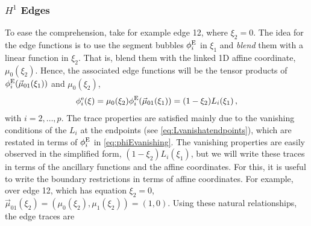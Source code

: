 
%

\subsubsection{\texorpdfstring{$H^1$}{H1} Edges}
\label{sec:H1edgesQuad}
To ease the comprehension, take for example edge 12, where $\xi_2=0$.
The idea for the edge functions is to use the segment bubbles $\phi_i^{\mathrm{E}}$ in $\xi_1$ and \textit{blend} them with a linear function in $\xi_2$.
That is, blend them with the linked 1D affine coordinate, $\mu_0(\xi_2)$.
Hence, the associated edge functions will be the tensor products of $\phi_i^{\mathrm{E}}(\vec{\mu}_{01}(\xi_1))$ and $\mu_0(\xi_2)$,
\begin{equation*}
    \phi_i^\mathrm{e}(\xi)=\mu_0(\xi_2)\phi_i^{\mathrm{E}}(\vec{\mu}_{01}(\xi_1))=(1-\xi_2)L_i(\xi_1)\,,
\end{equation*}
with $i=2,\ldots,p$.
The trace properties are satisfied mainly due to the vanishing conditions of the $L_i$ at the endpoints (see \eqref{eq:Lvanishatendpoints}), which are restated in terms of $\phi_i^{\mathrm{E}}$ in \eqref{eq:phiEvanishing}. 
The vanishing properties are easily observed in the simplified form, $(1-\xi_2)L_i(\xi_1)$, but we will write these traces in terms of the ancillary functions and the affine coordinates. %
For this, it is useful to write the boundary restrictions in terms of affine coordinates.
For example, over edge 12, which has equation $\xi_2=0$, $\vec{\mu}_{01}(\xi_2)=(\mu_0(\xi_2),\mu_1(\xi_2))=(1,0)$. 
Using these natural relationships, the edge traces are
